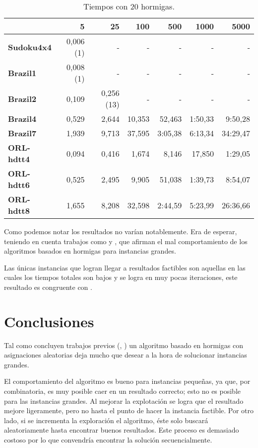 \documentclass[letter, 10pt]{article}
\renewcommand{\bf}[1]{\textbf{#1}}
\begin{document}
\begin{table}[h]
\centering
\begin{tabular}{|l|r|r|r|r|r|r|}
  \hline
                 & 5         & 25  & 100    & 500    & 1000    & 5000     \\\hline
  \bf{Sudoku4x4} & 0,006 (1) & -   & -      & -      & -       & -        \\\hline
  \bf{Brazil1}   & 0,008 (1) & -   & -      & -      & -       & -        \\\hline
  \bf{Brazil2}   & 0,109  & 0,256 (13) & -  & -      & -       & -        \\\hline
  \bf{Brazil4}   & 0,529  & 2,644  & 10,353 & 52,463 & 1:50,33 & 9:50,28  \\\hline
  \bf{Brazil7}   & 1,939  & 9,713  & 37,595 & 3:05,38& 6:13,34 & 34:29,47 \\\hline
  \bf{ORL-hdtt4} & 0,094  & 0,416  & 1,674  & 8,146  & 17,850  & 1:29,05  \\\hline
  \bf{ORL-hdtt6} & 0,525  & 2,495  & 9,905  & 51,038 & 1:39,73 & 8:54,07  \\\hline
  \bf{ORL-hdtt8} & 1,655  & 8,208  & 32,598 & 2:44,59& 5:23,99 & 26:36,66 \\\hline
\end{tabular}
\caption{Tiempos con 20 hormigas.}\label{tab:20ants:time}
\end{table}

Como podemos notar los resultados no varían notablemente. Era de esperar,
teniendo en cuenta trabajos como \cite{socha2003ant} y
\cite{rossi2002comparison}, que afirman el mal comportamiento de los algoritmos
basados en hormigas para instancias grandes.

Las únicas instancias que logran llegar a resultados factibles son aquellas en
las cuales los tiempos totales son bajos y se logra en muy pocas iteraciones,
este resultado es congruente con \cite{rossi2002comparison}.

\section{Conclusiones}\label{sec:conc}
Tal como concluyen trabajos previos (\cite{socha2003ant},
\cite{rossi2002comparison}) un algoritmo basado en hormigas con asignaciones
aleatorias deja mucho que desear a la hora de solucionar instancias grandes.

El comportamiento del algoritmo es bueno para instancias pequeñas, ya que, por
combinatoria, es muy posible caer en un resultado correcto; esto no es posible
para las instancias grandes. Al mejorar la explotación se logra que el resultado
mejore ligeramente, pero no hasta el punto de hacer la instancia factible.
Por otro lado, si se incrementa la exploración el algoritmo, éste solo buscará
aleatoriamente hasta encontrar buenos resultados. Este proceso es demasiado
costoso por lo que convendría encontrar la solución secuencialmente.
\end{document}
